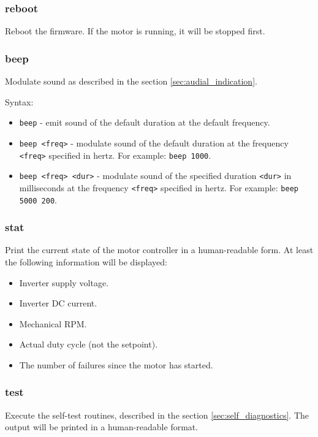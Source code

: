 \documentclass{zubaxdoc}
\begin{document}
\subsubsection{reboot}

Reboot the firmware.
If the motor is running, it will be stopped first.

\subsubsection{beep}

Modulate sound as described in the section \ref{sec:audial_indication}.

Syntax:
\begin{itemize}
\item \verb|beep| - emit sound of the default duration at the default frequency.
\item \verb|beep <freq>| - modulate sound of the default duration at the frequency \verb|<freq>|
specified in hertz. For example: \verb|beep 1000|.
\item \verb|beep <freq> <dur>| - modulate sound of the specified duration \verb|<dur>| in milliseconds
at the frequency \verb|<freq>| specified in hertz. For example: \verb|beep 5000 200|.
\end{itemize}

\subsubsection{stat}

Print the current state of the motor controller in a human-readable form.
At least the following information will be displayed:
\begin{itemize}
\item Inverter supply voltage.
\item Inverter DC current.
\item Mechanical RPM.
\item Actual duty cycle (not the setpoint).
\item The number of failures since the motor has started.
\end{itemize}

\subsubsection{test}

Execute the self-test routines, described in the section \ref{sec:self_diagnostics}.
The output will be printed in a human-readable format.
\end{document}
